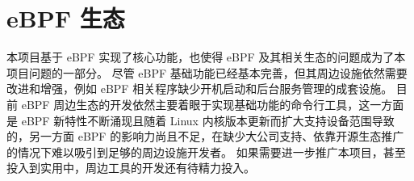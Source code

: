 \section{eBPF 生态}

本项目基于 eBPF 实现了核心功能，也使得 eBPF 及其相关生态的问题成为了本项目问题的一部分。
尽管 eBPF 基础功能已经基本完善，但其周边设施依然需要改进和增强，例如 eBPF 相关程序缺少开机启动和后台服务管理的成套设施。
目前 eBPF 周边生态的开发依然主要着眼于实现基础功能的命令行工具，这一方面是 eBPF 新特性不断涌现且随着 Linux 内核版本更新而扩大支持设备范围导致的，另一方面 eBPF 的影响力尚且不足，在缺少大公司支持、依靠开源生态推广的情况下难以吸引到足够的周边设施开发者。
如果需要进一步推广本项目，甚至投入到实用中，周边工具的开发还有待精力投入。
